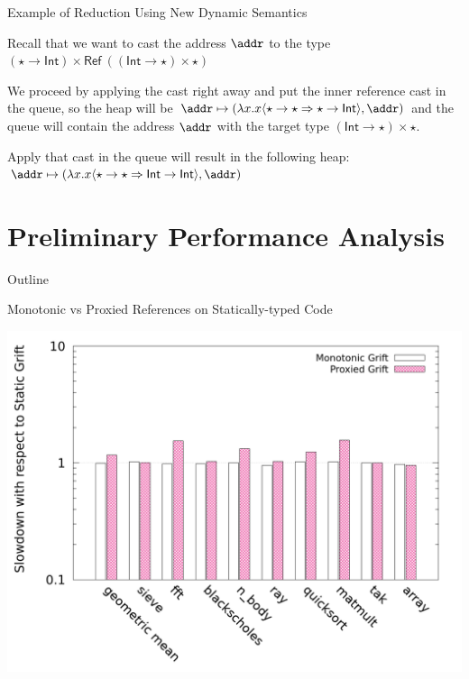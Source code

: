 \documentclass[12pt,dvipsnames]{beamer}
\newcommand{\cast}{\Rightarrow}
\newcommand{\IntT}{\ensuremath{\mathsf{Int}}}
\newcommand{\DynT}{\ensuremath{\mathsf{\star}}}
\newcommand{\RefT}[1]{\ensuremath{\mathsf{Ref}\ #1}}
\newcommand{\FunT}[2]{\ensuremath{#1 \to #2}}
\newcommand{\PairT}[2]{\ensuremath{#1 \times #2}}
\newcommand{\coercion}[1]{\ensuremath{\langle #1 \rangle}}
\newcommand{\coerce}[2]{\ensuremath{#1 \coercion{#2}}}
\newcommand{\coerced}[2]{\ensuremath{\coerce{#1}{#2}}}
\newcommand{\pair}[2]{\ensuremath{(#1,#2)}}
\begin{document}
\begin{frame}[fragile]{Example of Reduction Using New Dynamic Semantics}
  \begin{center}
    Recall that we want to cast the address $\addr$ to the type
    $\PairT{(\FunT{\DynT}{\IntT})}{\RefT{(\PairT{(\FunT{\IntT}{\DynT})}{\DynT})}}$
    \\
    \pause
    \vspace{0.5cm}
    
    We proceed by applying the cast right away and put the inner
    reference cast in the queue, so the heap will be
    $\addr \mapsto \pair{\coerced{\lambda x. x}{\FunT{\DynT}{\DynT}
        \cast \FunT{\DynT}{\IntT}}}{\addr}$ and the queue will contain
    the address $\addr$ with the target type
    $\PairT{(\FunT{\IntT}{\DynT})}{\DynT}$.
    \\
    \pause
    \vspace{0.5cm}

    Apply that cast in the queue will result in the following heap:
    $ \addr \mapsto\pair{\coerced{\lambda x. x }{\FunT{\DynT}{\DynT}
        \cast\FunT{\IntT}{\IntT}}}{\addr}$
  \end{center}
\end{frame}

\section{Preliminary Performance Analysis}

\begin{frame}{Outline}
  \tableofcontents[currentsection]
\end{frame}

\begin{frame}{Monotonic vs Proxied References on Statically-typed Code}
  \begin{center}
    \includegraphics[scale=0.25]{plots/static.png}
  \end{center}
\end{frame}
\end{document}
